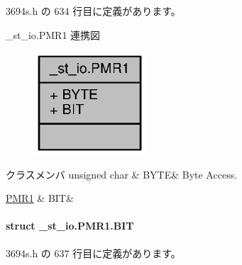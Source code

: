  3694s.\+h の 634 行目に定義があります。



\+\_\+st\+\_\+io.\+P\+M\+R1 連携図
\nopagebreak
\begin{figure}[H]
\begin{center}
\leavevmode
\includegraphics[width=118pt]{d6/d70/union__st__io_8PMR1__coll__graph}
\end{center}
\end{figure}
\begin{DoxyFields}{クラスメンバ}
unsigned char\label{3694s_8h_ae409eb2ba6eb6801f52763ae370c350e}
&
B\+Y\+T\+E&
Byte Access. \\
\hline

\hyperlink{3694s_8h_d1/d2d/struct__st__io_8PMR1_8BIT}{P\+M\+R1}\label{3694s_8h_adb957fdc8000e1eef04a243f5199aa52}
&
B\+I\+T&
\\
\hline

\end{DoxyFields}
\label{struct__st__io_8PMR1_8BIT}
\paragraph{struct \+\_\+st\+\_\+io.\+P\+M\+R1.\+B\+I\+T}


 3694s.\+h の 637 行目に定義があります。



